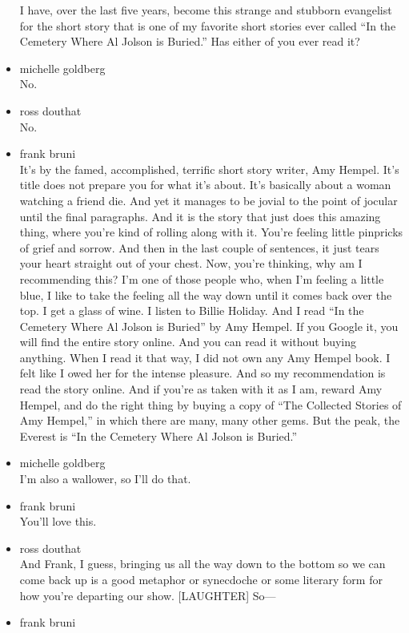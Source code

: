 \begin{itemize}
  I have, over the last five years, become this strange and stubborn
  evangelist for the short story that is one of my favorite short
  stories ever called ``In the Cemetery Where Al Jolson is Buried.'' Has
  either of you ever read it?
\item
  michelle goldberg\\
  No.
\item
  ross douthat\\
  No.
\item
  frank bruni\\
  It's by the famed, accomplished, terrific short story writer, Amy
  Hempel. It's title does not prepare you for what it's about. It's
  basically about a woman watching a friend die. And yet it manages to
  be jovial to the point of jocular until the final paragraphs. And it
  is the story that just does this amazing thing, where you're kind of
  rolling along with it. You're feeling little pinpricks of grief and
  sorrow. And then in the last couple of sentences, it just tears your
  heart straight out of your chest. Now, you're thinking, why am I
  recommending this? I'm one of those people who, when I'm feeling a
  little blue, I like to take the feeling all the way down until it
  comes back over the top. I get a glass of wine. I listen to Billie
  Holiday. And I read ``In the Cemetery Where Al Jolson is Buried'' by
  Amy Hempel. If you Google it, you will find the entire story online.
  And you can read it without buying anything. When I read it that way,
  I did not own any Amy Hempel book. I felt like I owed her for the
  intense pleasure. And so my recommendation is read the story online.
  And if you're as taken with it as I am, reward Amy Hempel, and do the
  right thing by buying a copy of ``The Collected Stories of Amy
  Hempel,'' in which there are many, many other gems. But the peak, the
  Everest is ``In the Cemetery Where Al Jolson is Buried.''
\item
  michelle goldberg\\
  I'm also a wallower, so I'll do that.
\item
  frank bruni\\
  You'll love this.
\item
  ross douthat\\
  And Frank, I guess, bringing us all the way down to the bottom so we
  can come back up is a good metaphor or synecdoche or some literary
  form for how you're departing our show. {[}LAUGHTER{]} So---
\item
  frank bruni\\

\end{itemize}
